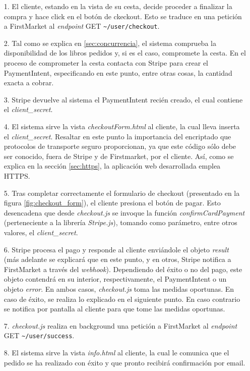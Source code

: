 \documentclass[a4paper]{article}
\begin{document}
    \begin{itemize}
    	\item[1.] El cliente, estando en la vista de su cesta, decide proceder a finalizar la compra y hace click en el botón de ckeckout. Esto se traduce en una petición a FirstMarket al \emph{endpoint} GET \nolinkurl{~/user/checkout}. 
    	\item[2.] Tal como se explica en \ref{sec:concurrencia}, el sistema comprueba la disponibilidad de los libros pedidos y, si es el caso, compromete la cesta. En el proceso de comprometer la cesta contacta con Stripe para crear el PaymentIntent, especificando en este punto, entre otras cosas, la cantidad exacta a cobrar.
    	\item[3.] Stripe devuelve al sistema el PaymentIntent recién creado, el cual contiene el \emph{client\_secret}.
    	\item[4.] El sistema sirve la vista \emph{checkoutForm.html} al cliente, la cual lleva inserta el \emph{client\_secret}. Resaltar en este punto la importancia del encriptado que protocolos de transporte seguro proporcionan, ya que este código sólo debe ser conocido, fuera de Stripe y de Firstmarket, por el cliente. Así, como se explica en la sección \ref{sec:https}, la aplicación web desarrollada emplea HTTPS.
    	\item[5.] Tras completar correctamente el formulario de checkout (presentado en la figura \ref{fig:checkout_form}), el cliente presiona el botón de pagar. Esto desencadena que desde \emph{checkout.js} se invoque la función \emph{confirmCardPayment} (perteneciente a la librería \emph{Stripe.js}), tomando como parámetro, entre otros valores, el \emph{client\_secret}.
    	\item[6.] Stripe procesa el pago y responde al cliente enviándole el objeto \emph{result} (más adelante se explicará que en este punto, y en otros, Stripe notifica a FirstMarket a través del \emph{webhook}). Dependiendo del éxito o no del pago, este objeto contendrá en su interior, respectivamente, el PaymentIntent o un objeto \emph{error}. En ambos casos, \emph{checkout.js} toma las medidas oportunas. En caso de éxito, se realiza lo explicado en el siguiente punto. En caso contrario se notifica por pantalla al cliente para que tome las medidas oportunas.
    	\item[7.] \emph{checkout.js} realiza en background una petición a FirstMarket al \emph{endpoint} GET \nolinkurl{~/user/success}.
    	\item[8.] El sistema sirve la vista \emph{info.html} al cliente, la cual le comunica que el pedido se ha realizado con éxito y que pronto recibirá confirmación por email.
    \end{itemize}
    
\end{document}
